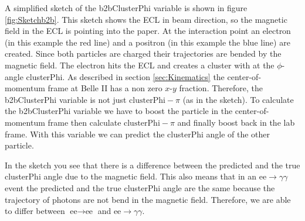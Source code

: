 \documentclass[a4paper,11pt,twosided,final,german,openbib,pdftex,listof=totoc,bibliography=totoc]{scrbook}
\begin{document}
A simplified sketch of the b2bClusterPhi variable is shown in figure \ref{fig:Sketchb2b}. This sketch shows the ECL in beam direction, so the magnetic field in the ECL is pointing into the paper. At the interaction point an electron (in this example the red line) and a positron (in this example the blue line) are created. Since both particles are charged their trajectories are bended by the magnetic field. The electron hits the ECL and creates a cluster with at the $\phi$-angle clusterPhi. As described in section \ref{sec:Kinematics} the center-of-momentum frame at Belle II has a non zero $x$-$y$ fraction. Therefore, the b2bClusterPhi variable is not just $\textrm{clusterPhi} - \pi$ (as in the sketch). To calculate the b2bClusterPhi variable we have to boost the particle in the center-of-momentum frame then calculate $\textrm{clusterPhi} - \pi$ and finally boost back in the lab frame. With this variable we can predict the clusterPhi angle of the other particle. 

In the sketch you see that there is a difference between the predicted and the true clusterPhi angle due to the magnetic field. This also means that in an $\textrm{ee} \rightarrow \gamma \gamma$ event the predicted and the true clusterPhi angle are the same because the trajectory of photons are not bend in the magnetic field. Therefore, we are able to differ between $\textrm{ee} \rightarrow \textrm{ee}$ and $\textrm{ee} \rightarrow \gamma \gamma$.
\end{document}
